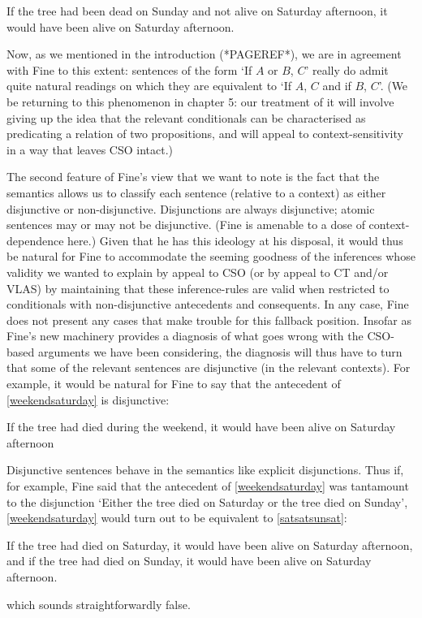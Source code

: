 \documentclass[If.tex]{subfiles}
\begin{document}
\begin{prop}
\begin{prop}
	\nitem \label{bad}
		If the tree had been dead on Sunday and not alive on Saturday afternoon, it would have been alive on Saturday afternoon.
\end{prop}
Now, as we mentioned in the introduction (*PAGEREF*), we are in agreement with Fine to this extent: sentences of the form ‘If $A$ or $B$, $C$’ really do admit quite natural readings on which they are equivalent to ‘If $A$, $C$ and if $B$, $C$’. (We be returning to this phenomenon in chapter 5: our treatment of it will involve giving up the idea that the relevant conditionals can be characterised as predicating a relation of two propositions, and will appeal to context-sensitivity in a way that leaves CSO intact.)

The second feature of Fine's view that we want to note is the fact that the semantics allows us to classify each sentence (relative to a context) as either disjunctive or non-disjunctive. Disjunctions are always disjunctive; atomic sentences may or may not be disjunctive. (Fine is amenable to a dose of context-dependence here.) Given that he has this ideology at his disposal, it would thus be natural for Fine to accommodate the seeming goodness of the inferences whose validity we wanted to explain by appeal to CSO (or by appeal to CT and/or VLAS) by maintaining that these inference-rules are valid when restricted to conditionals with non-disjunctive antecedents and consequents. In any case, Fine does not present any cases that make trouble for this fallback position. Insofar as Fine's new machinery provides a diagnosis of what goes wrong with the CSO-based arguments we have been considering, the diagnosis will thus have to turn that some of the relevant sentences are disjunctive (in the relevant contexts). For example, it would be natural for Fine to say that the antecedent of \ref{weekendsaturday} is disjunctive:
\begin{prop}
	\nitem \label{weekendsaturday}
		If the tree had died during the weekend, it would have been alive on Saturday afternoon
\end{prop}
Disjunctive sentences behave in the semantics like explicit disjunctions. Thus if, for example, Fine said that the antecedent of \ref{weekendsaturday} was tantamount to the disjunction ‘Either the tree died on Saturday or the tree died on Sunday’, \ref{weekendsaturday} would turn out to be equivalent to \ref{satsatsunsat}:
\begin{prop}
	\nitem \label{satsatsunsat}
		If the tree had died on Saturday, it would have been alive on Saturday afternoon, and if the tree had died on Sunday, it would have been alive on Saturday afternoon.
\end{prop}
which sounds straightforwardly false.


\end{prop}
\end{document}
